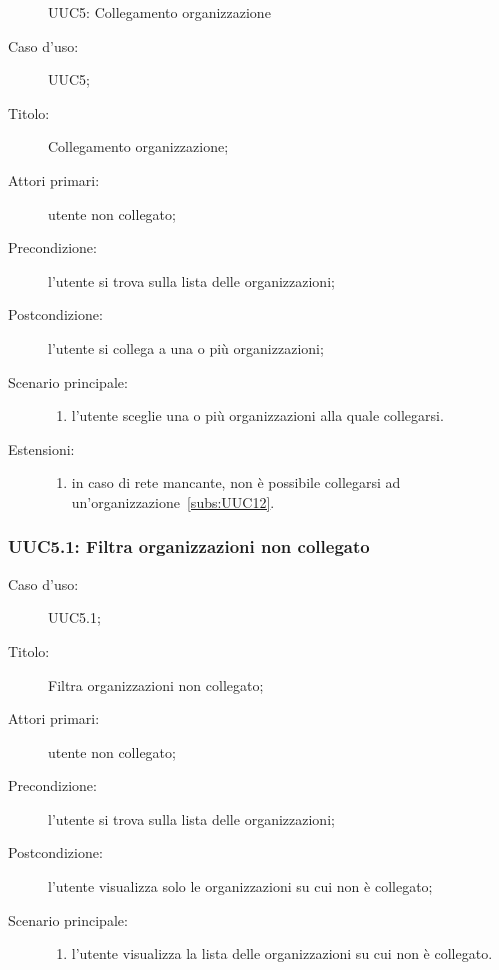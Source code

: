\documentclass[../../../analisi-dei-requisiti.tex]{subfiles}
\begin{document}
\begin{figure}[H]
  \centering
  \caption{UUC5: Collegamento organizzazione}%
  \label{fig:uuc5}
\end{figure}

\begin{description}
  \item[Caso d’uso:] UUC5;
  \item[Titolo:] Collegamento organizzazione;
  \item[Attori primari:] utente non collegato;
  \item[Precondizione:] l'utente si trova sulla lista delle organizzazioni;
  \item[Postcondizione:] l'utente si collega a una o più organizzazioni;
  \item[Scenario principale:]
        \begin{enumerate}
          \item l'utente sceglie una o più organizzazioni alla quale collegarsi.
        \end{enumerate}
  \item[Estensioni:]
        \begin{enumerate}
          \item in caso di rete mancante, non è possibile collegarsi ad un'organizzazione~\ref{subs:UUC12}.
        \end{enumerate}
\end{description}


\subsubsection{UUC5.1: Filtra organizzazioni non collegato}%
\begin{description}
  \item[Caso d’uso:] UUC5.1;
  \item[Titolo:] Filtra organizzazioni non collegato;
  \item[Attori primari:] utente non collegato;
  \item[Precondizione:] l'utente si trova sulla lista delle organizzazioni;
  \item[Postcondizione:] l'utente visualizza solo le organizzazioni su cui non è collegato;
  \item[Scenario principale:]
        \begin{enumerate}
          \item l'utente visualizza la lista delle organizzazioni su cui non è collegato.
        \end{enumerate}
\end{description}
\end{document}
